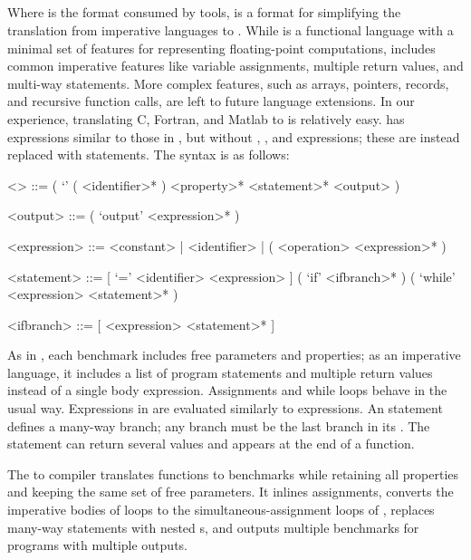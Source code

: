 \documentclass[main.tex]{subfiles}
\begin{document}
\subsection{\surface}

Where \core is the format consumed by tools,
  \surface is a format for simplifying the translation
  from imperative languages to \core.
While \core is a functional language
  with a minimal set of features
  for representing floating-point computations,
  \surface includes common imperative features
  like variable assignments,
  multiple return values,
  and multi-way  statements.
More complex features,
  such as arrays, pointers, records, and recursive function calls,
  are left to future language extensions.
In our experience,
  translating C, Fortran, and Matlab to \surface is relatively easy.
\surface has expressions similar to those in \core,
  but without , , and  expressions;
  these are instead replaced with statements.
The \surface syntax is as follows:

\begin{grammar}
<\surface> ::= ( `\surface' ( <identifier>* ) <property>* <statement>* <output> )

<output> ::= ( `output' <expression>* )

<expression> ::= <constant> | <identifier> | ( <operation> <expression>* )

<statement> ::= [ `=' <identifier> <expression> ]
\alt ( `if' <ifbranch>* )
\alt ( `while' <expression> <statement>* )

<ifbranch> ::= [ <expression> <statement>* ]
\end{grammar}

As in \core, each \surface benchmark
  includes free parameters and properties;
  as an imperative language,
  it includes a list of program statements
  and multiple return values
  instead of a single body expression.
Assignments and while loops behave in the usual way.
Expressions in \surface are evaluated similarly to \core expressions.
An  statement defines a many-way branch;
  any  branch must be the last branch in its .
The  statement can return several values and appears
  at the end of a function.

The \surface to \core compiler
  translates \surface functions to \core benchmarks
  while retaining all properties and keeping the same set of free parameters.
It inlines assignments, converts the imperative bodies of \surface loops
  to the simultaneous-assignment loops of \core,
  replaces many-way  statements with nested s,
  and outputs multiple \core benchmarks for \surface programs with
  multiple outputs.
\end{document}
